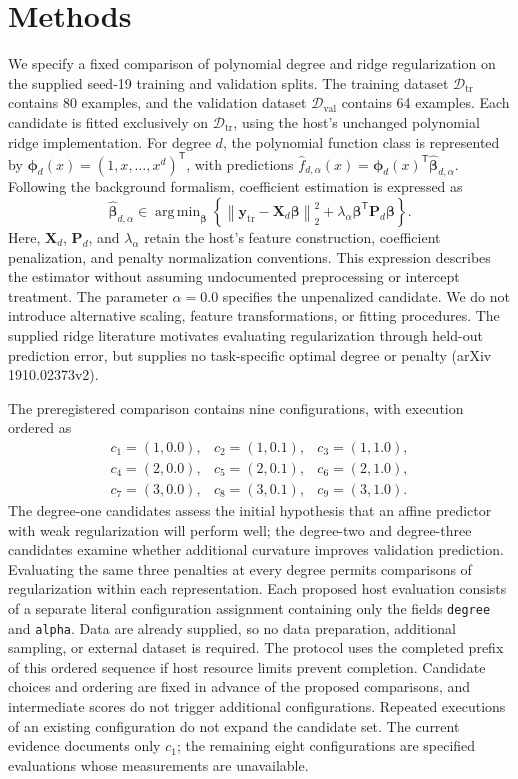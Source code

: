 \documentclass[11pt]{article}
\begin{document}
\section{Methods}
We specify a fixed comparison of polynomial degree and ridge regularization on the supplied seed-19 training and validation splits. The training dataset \(\mathcal{D}_{\mathrm{tr}}\) contains 80 examples, and the validation dataset \(\mathcal{D}_{\mathrm{val}}\) contains 64 examples. Each candidate is fitted exclusively on \(\mathcal{D}_{\mathrm{tr}}\), using the host's unchanged polynomial ridge implementation. For degree \(d\), the polynomial function class is represented by \(\boldsymbol{\phi}_d(x)=(1,x,\ldots,x^d)^{\mathsf T}\), with predictions \(\widehat f_{d,\alpha}(x)=\boldsymbol{\phi}_d(x)^{\mathsf T}\widehat{\boldsymbol{\beta}}_{d,\alpha}\). Following the background formalism, coefficient estimation is expressed as
\[
\widehat{\boldsymbol{\beta}}_{d,\alpha}
\in \mathop{\mathrm{arg\,min}}_{\boldsymbol{\beta}}
\left\{
\left\|\mathbf{y}_{\mathrm{tr}}-\mathbf{X}_d\boldsymbol{\beta}\right\|_2^2
+\lambda_{\alpha}\boldsymbol{\beta}^{\mathsf T}
\mathbf{P}_d\boldsymbol{\beta}
\right\}.
\]
Here, \(\mathbf{X}_d\), \(\mathbf{P}_d\), and \(\lambda_{\alpha}\) retain the host's feature construction, coefficient penalization, and penalty normalization conventions. This expression describes the estimator without assuming undocumented preprocessing or intercept treatment. The parameter \(\alpha=0.0\) specifies the unpenalized candidate. We do not introduce alternative scaling, feature transformations, or fitting procedures. The supplied ridge literature motivates evaluating regularization through held-out prediction error, but supplies no task-specific optimal degree or penalty (arXiv 1910.02373v2).

The preregistered comparison contains nine configurations, with execution ordered as
\[
\begin{array}{lll}
c_1=(1,0.0), & c_2=(1,0.1), & c_3=(1,1.0),\\
c_4=(2,0.0), & c_5=(2,0.1), & c_6=(2,1.0),\\
c_7=(3,0.0), & c_8=(3,0.1), & c_9=(3,1.0).
\end{array}
\]
The degree-one candidates assess the initial hypothesis that an affine predictor with weak regularization will perform well; the degree-two and degree-three candidates examine whether additional curvature improves validation prediction. Evaluating the same three penalties at every degree permits comparisons of regularization within each representation. Each proposed host evaluation consists of a separate literal configuration assignment containing only the fields \texttt{degree} and \texttt{alpha}. Data are already supplied, so no data preparation, additional sampling, or external dataset is required. The protocol uses the completed prefix of this ordered sequence if host resource limits prevent completion. Candidate choices and ordering are fixed in advance of the proposed comparisons, and intermediate scores do not trigger additional configurations. Repeated executions of an existing configuration do not expand the candidate set. The current evidence documents only \(c_1\); the remaining eight configurations are specified evaluations whose measurements are unavailable.
\end{document}
